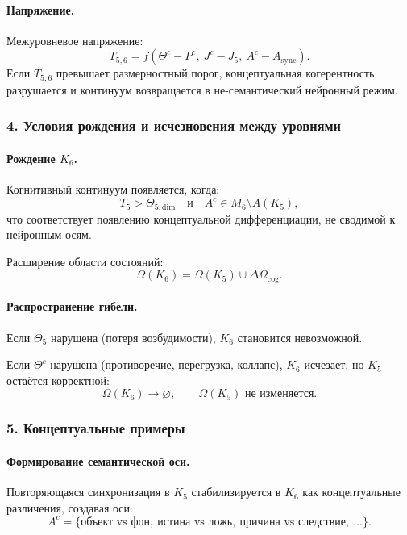\paragraph{Напряжение.}
Межуровневое напряжение:
\[
T_{5,6} = f(\Theta^{c} - P^{c},\ J^{c} - J_5,\ A^{c} - A_{\mathrm{sync}}).
\]
Если $T_{5,6}$ превышает размерностный порог, концептуальная когерентность
разрушается и континуум возвращается в не-семантический нейронный режим.

\subsubsection{4. Условия рождения и исчезновения между уровнями}

\paragraph{Рождение \texorpdfstring{$K_6$}{K_6}.}
Когнитивный континуум появляется, когда:
\[
T_5 > \Theta_{5,\mathrm{dim}}
\quad\text{и}\quad
A^{c} \in M_6 \setminus A(K_5),
\]
что соответствует появлению концептуальной дифференциации, не сводимой к
нейронным осям.

Расширение области состояний:
\[
\Omega(K_6) = \Omega(K_5) \cup \Delta\Omega_{\mathrm{cog}}.
\]

\paragraph{Распространение гибели.}
Если $\Theta_5$ нарушена (потеря возбудимости), $K_6$ становится невозможной.

Если $\Theta^{c}$ нарушена (противоречие, перегрузка, коллапс), $K_6$
исчезает, но $K_5$ остаётся корректной:
\[
\Omega(K_6) \rightarrow \varnothing,
\qquad
\Omega(K_5) \text{ не изменяется}.
\]

\subsubsection{5. Концептуальные примеры}

\paragraph{Формирование семантической оси.}
Повторяющаяся синхронизация в $K_5$ стабилизируется в $K_6$ как
концептуальные различения, создавая оси:
\[
A^{c} = \{\text{объект vs фон},\ \text{истина vs ложь},\
         \text{причина vs следствие},\ \ldots\}.
\]

